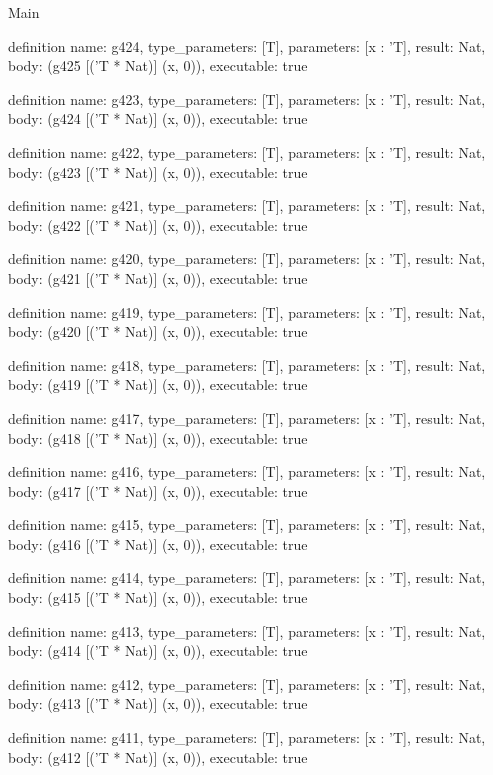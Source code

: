 \begin{lexlean}{Main}
\begin{semanticmodule}
definition{
  name: g424,
  type_parameters: [T],
  parameters: [x : 'T],
  result: Nat,
  body: (g425 [('T * Nat)] (x, 0)),
  executable: true
}

definition{
  name: g423,
  type_parameters: [T],
  parameters: [x : 'T],
  result: Nat,
  body: (g424 [('T * Nat)] (x, 0)),
  executable: true
}

definition{
  name: g422,
  type_parameters: [T],
  parameters: [x : 'T],
  result: Nat,
  body: (g423 [('T * Nat)] (x, 0)),
  executable: true
}

definition{
  name: g421,
  type_parameters: [T],
  parameters: [x : 'T],
  result: Nat,
  body: (g422 [('T * Nat)] (x, 0)),
  executable: true
}

definition{
  name: g420,
  type_parameters: [T],
  parameters: [x : 'T],
  result: Nat,
  body: (g421 [('T * Nat)] (x, 0)),
  executable: true
}

definition{
  name: g419,
  type_parameters: [T],
  parameters: [x : 'T],
  result: Nat,
  body: (g420 [('T * Nat)] (x, 0)),
  executable: true
}

definition{
  name: g418,
  type_parameters: [T],
  parameters: [x : 'T],
  result: Nat,
  body: (g419 [('T * Nat)] (x, 0)),
  executable: true
}

definition{
  name: g417,
  type_parameters: [T],
  parameters: [x : 'T],
  result: Nat,
  body: (g418 [('T * Nat)] (x, 0)),
  executable: true
}

definition{
  name: g416,
  type_parameters: [T],
  parameters: [x : 'T],
  result: Nat,
  body: (g417 [('T * Nat)] (x, 0)),
  executable: true
}

definition{
  name: g415,
  type_parameters: [T],
  parameters: [x : 'T],
  result: Nat,
  body: (g416 [('T * Nat)] (x, 0)),
  executable: true
}

definition{
  name: g414,
  type_parameters: [T],
  parameters: [x : 'T],
  result: Nat,
  body: (g415 [('T * Nat)] (x, 0)),
  executable: true
}

definition{
  name: g413,
  type_parameters: [T],
  parameters: [x : 'T],
  result: Nat,
  body: (g414 [('T * Nat)] (x, 0)),
  executable: true
}

definition{
  name: g412,
  type_parameters: [T],
  parameters: [x : 'T],
  result: Nat,
  body: (g413 [('T * Nat)] (x, 0)),
  executable: true
}

definition{
  name: g411,
  type_parameters: [T],
  parameters: [x : 'T],
  result: Nat,
  body: (g412 [('T * Nat)] (x, 0)),
  executable: true
}


\end{semanticmodule}
\end{lexlean}
